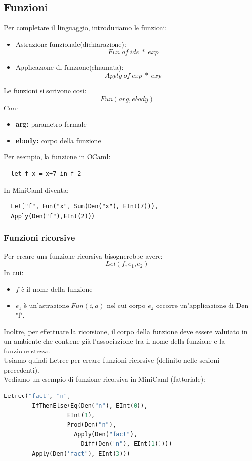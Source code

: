 \documentclass[12pt,a4paper]{article}
\begin{document}
\subsection{Funzioni}
Per completare il linguaggio, introduciamo le funzioni:
\begin{itemize}
  \item Astrazione funzionale(dichiarazione):
  \[
  Fun\ of\ ide\ *\ exp
  \]
  \item Applicazione di funzione(chiamata):
  \[
  Apply\ of\ exp\ *\ exp
  \]
\end{itemize}
Le funzioni si scrivono cosi:
\[
Fun(arg, ebody)
\]
Con:
\begin{itemize}
  \item \textbf{arg:} parametro formale
  \item \textbf{ebody:} corpo della funzione
\end{itemize}
Per esempio, la funzione in OCaml:
\begin{lstlisting}
  let f x = x+7 in f 2
\end{lstlisting}
In MiniCaml diventa:
\begin{lstlisting}
  Let("f", Fun("x", Sum(Den("x"), EInt(7))), 
  Apply(Den("f"),EInt(2)))
\end{lstlisting}
\subsubsection{Funzioni ricorsive}
Per creare una funzione ricorsiva bisognerebbe avere:
\[
Let(f, e_1, e_2)
\]
In cui:
\begin{itemize}
  \item $f$ è il nome della funzione
  \item $e_1$ è un'astrazione $Fun(i, a)$ nel cui corpo $e_2$ occorre un'applicazione di Den "f".\\
\end{itemize}
Inoltre, per effettuare la ricorsione, il corpo della funzione deve essere valutato in un ambiente che contiene già l'associazione tra il nome della funzione e la funzione stessa.\\
Usiamo quindi Letrec per creare funzioni ricorsive (definito nelle sezioni precedenti).\\
Vediamo un esempio di funzione ricorsiva in MiniCaml (fattoriale):
\begin{lstlisting}[language=OCaml]
  Letrec("fact", "n",
        IfThenElse(Eq(Den("n"), EInt(0)),
                  EInt(1),
                  Prod(Den("n"),
                    Apply(Den("fact"),
                      Diff(Den("n"), EInt(1)))))
        Apply(Den("fact"), EInt(3)))
\end{lstlisting}
\end{document}
